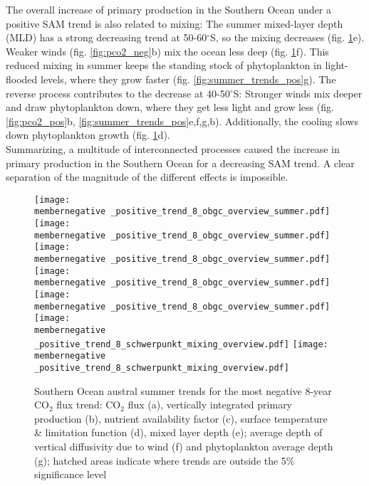 \documentclass[12pt]{article}
\newcommand{\membernegative}{m143_1995_2002}
\begin{document}
The overall increase of primary production in the Southern Ocean under a positive SAM trend is also related to mixing:
The summer mixed-layer depth (MLD) has a strong decreasing trend at 50-60$^\circ$S, so the mixing decreases (fig. \ref{fig:summer_trends_neg}e). Weaker winds (fig. \ref{fig:pco2_neg}b) mix the ocean less deep (fig. \ref{fig:summer_trends_neg}f). This reduced mixing in summer keeps the standing stock of phytoplankton in light-flooded levels, where they grow faster (fig. \ref{fig:summer_trends_pos}g). 
The reverse process contributes to the decrease at 40-50$^\circ$S: Stronger winds mix deeper and draw phytoplankton down, where they get less light and grow less (fig. \ref{fig:pco2_pos}b, \ref{fig:summer_trends_pos}e,f,g,b). Additionally, the cooling slows down phytoplankton growth (fig. \ref{fig:summer_trends_neg}d).
\\

Summarizing, a multitude of interconnected processes caused the increase in primary production in the Southern Ocean for a decreasing SAM trend. A clear separation of the magnitude of the different effects is impossible.
 

\begin{figure}[h!]
	\texttt{[image: \\membernegative \_positive\_trend\_8\_obgc\_overview\_summer.pdf]} %
	\texttt{[image: \\membernegative \_positive\_trend\_8\_obgc\_overview\_summer.pdf]} %
	\texttt{[image: \\membernegative \_positive\_trend\_8\_obgc\_overview\_summer.pdf]} %
	\texttt{[image: \\membernegative \_positive\_trend\_8\_obgc\_overview\_summer.pdf]} %
	\texttt{[image: \\membernegative \_positive\_trend\_8\_obgc\_overview\_summer.pdf]} %
	\texttt{[image: \\membernegative \_positive\_trend\_8\_schwerpunkt\_mixing\_overview.pdf]} %
	\texttt{[image: \\membernegative \_positive\_trend\_8\_schwerpunkt\_mixing\_overview.pdf]} %

		\caption{Southern Ocean austral summer trends for the most negative 8-year CO$_2$ flux trend: CO$_2$ flux (a), vertically integrated primary production (b), nutrient availability factor (c), surface temperature \& limitation function (d), mixed layer depth (e); average depth of vertical diffusivity due to wind (f) and phytoplankton average depth (g); hatched areas indicate where trends are outside the 5\% significance level}
	\label{fig:summer_trends_neg}
\end{figure}
\end{document}
